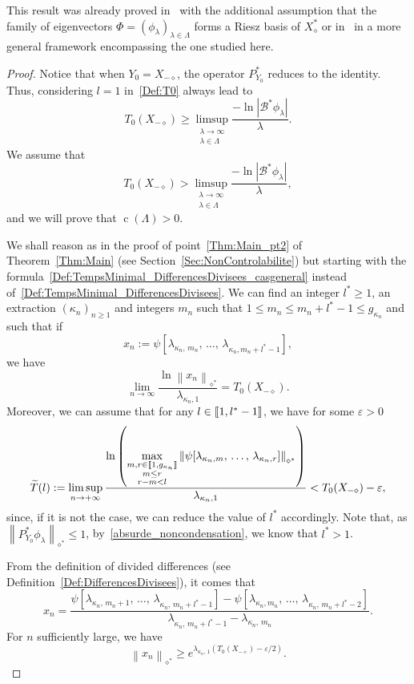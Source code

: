 \documentclass[AHL,Unicode,longabstracts]{cedram}
\newcommand{\llbracket}{\mathopen{[\mkern -2.7mu[}}
\newcommand{\rrbracket}{\mathclose{]\mkern -2.7mu]}}
\newcommand{\inter}[2]{\llbracket #1,#2 \rrbracket}
\newcommand\Bs{\mathcal{B}^*}
\newcommand{\Xalphas}{X_\diamond^*}
\newcommand{\Xmalpha}{X_{-\diamond}}
\newcommand{\Fzp}{Y_0}
\newcommand{\normeXalphas}[1]{\left\| #1 \right\|_{\diamond^*}}
\newcommand{\PFa}{P_{\Fzp}^*}
\newcommand{\n}{g}
\DeclareMathOperator{\cond}{c}
\begin{document}
This result was already proved in~\cite{AmmarKhodjaBenabdallahGonzalez-BurgosdeTeresa:2014} with the additional assumption that the family of eigenvectors $\Phi=(\phi_\lambda)_{\lambda \in \Lambda}$ forms a Riesz basis of $\Xalphas$ or in~\cite[Remark~1.15]{AKBGBM_2018} in a more general framework encompassing the one studied here.
\begin{proof}
Notice that when $\Fzp = \Xmalpha$, the operator $\PFa$ reduces to the identity. Thus, considering $l=1$ in~\eqref{Def:T0} always lead to
\[
T_{0}(\Xmalpha) \geq \limsup_{\substack{\lambda\to \infty\\ \lambda\in \Lambda}} \frac{-\ln \left| \Bs \phi_\lambda \right|}{\lambda}.
\]
We assume that
\begin{equation}\label{absurde_noncondensation}
T_{0}(\Xmalpha)>\limsup_{\substack{\lambda\to \infty\\ \lambda\in \Lambda}} \frac{-\ln \left| \Bs \phi_\lambda \right|}{\lambda},
\end{equation}
and we will prove that $\cond(\Lambda)>0$.

We shall reason as in the proof of point~\eqref{Thm:Main_pt2} of Theorem~\ref{Thm:Main} (see Section~\ref{Sec:NonControlabilite}) but starting with the formula~\eqref{Def:TempsMinimal_DifferencesDivisees_casgeneral} instead of~\eqref{Def:TempsMinimal_DifferencesDivisees}. We can find an integer $l^*\geq 1$, an extraction $(\kappa_n)_{n \geq 1}$ and integers $m_n$ such that $1\leq m_n\leq m_n+l^*-1\leq \n_{\kappa_n}$ and such that if
\[
x_n := \psi[\lambda_{\kappa_n,\,m_n},\,\dots,\, \lambda_{\kappa_n,m_n+l^*-1}],
\]
we have
\begin{equation*}\label{prop_ynbis}
\lim_{n \to \infty} \frac{\ln \normeXalphas{ x_n }}{\lambda_{\kappa_n,1}} = T_0(\Xmalpha).
\end{equation*}
Moreover, we can assume that for any $l \in \inter{1}{l^*-1}$, we have for some $\varepsilon>0$
\[
\widetilde{T}(l) := \limsup_{n \to + \infty} \frac{\ln \left(\max\limits_{\substack{m,r \in \inter{1}{\n_{\kappa_n}}\\ m\leq r \\ r-m < l} } \normeXalphas{ \psi[\lambda_{\kappa_n,m},\,\dots,\, \lambda_{\kappa_n,r}] } \right)}{\lambda_{\kappa_n,1}} < T_0(\Xmalpha)-\varepsilon,
\]
since, if it is not the case, we can reduce the value of $l^*$ accordingly. Note that, as $\normeXalphas{ \PFa \phi_\lambda } \leq 1$, by~\eqref{absurde_noncondensation}, we know that $l^*>1$.

From the definition of divided differences (see Definition~\ref{Def:DifferencesDivisees}), it comes that
\[
x_n = \frac{\psi[\lambda_{\kappa_n,\,m_n+1},\,\dots,\,\lambda_{\kappa_n,\,m_n+l^*-1}]-\psi[\lambda_{\kappa_n,m_n},\,\dots,\,\lambda_{\kappa_n,\,m_n+l^*-2}]}{\lambda_{\kappa_n,\,m_n+l^*-1}-\lambda_{\kappa_n,\,m_n}}.
\]
For $n$ sufficiently large, we have
\[
\normeXalphas{ x_n } \geq e^{\lambda_{\kappa_n,\,1} (T_0(\Xmalpha)-\varepsilon/2)}.
\]


\end{proof}
\end{document}
